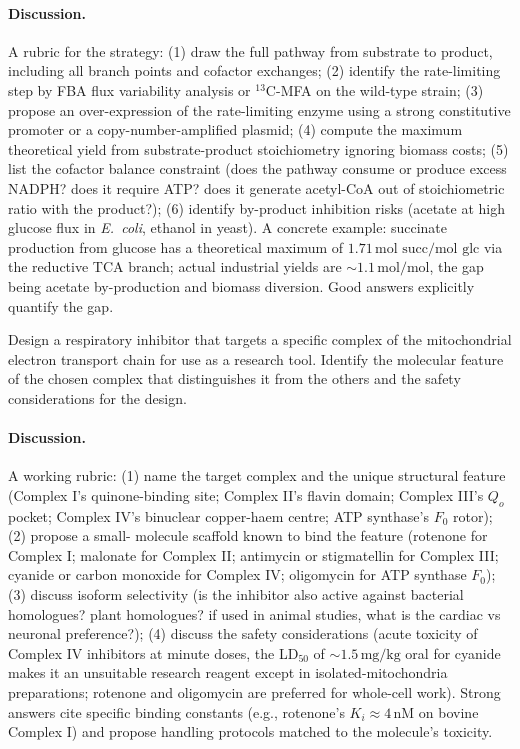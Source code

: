 \paragraph{Discussion.}
A rubric for the strategy: (1) draw the full pathway from substrate
to product, including all branch points and cofactor exchanges; (2)
identify the rate-limiting step by FBA flux variability analysis or
$^{13}$C-MFA on the wild-type strain; (3) propose an over-expression
of the rate-limiting enzyme using a strong constitutive promoter or
a copy-number-amplified plasmid; (4) compute the maximum theoretical
yield from substrate-product stoichiometry ignoring biomass costs;
(5) list the cofactor balance constraint (does the pathway consume
or produce excess NADPH? does it require ATP? does it generate
acetyl-CoA out of stoichiometric ratio with the product?); (6)
identify by-product inhibition risks (acetate at high glucose flux
in \emph{E.~coli}, ethanol in yeast). A concrete example: succinate
production from glucose has a theoretical maximum of $1.71\,\text{mol
succ/mol glc}$ via the reductive TCA branch; actual industrial yields
are $\sim 1.1\,\text{mol/mol}$, the gap being acetate by-production
and biomass diversion. Good answers explicitly quantify the gap.

\begin{exercise}
Design a respiratory inhibitor that targets a specific complex of the
mitochondrial electron transport chain for use as a research tool.
Identify the molecular feature of the chosen complex that distinguishes
it from the others and the safety considerations for the design.
\end{exercise}

\paragraph{Discussion.}
A working rubric: (1) name the target complex and the unique
structural feature (Complex I's quinone-binding site; Complex II's
flavin domain; Complex III's $Q_o$ pocket; Complex IV's binuclear
copper-haem centre; ATP synthase's $F_0$ rotor); (2) propose a small-
molecule scaffold known to bind the feature (rotenone for Complex I;
malonate for Complex II; antimycin or stigmatellin for Complex III;
cyanide or carbon monoxide for Complex IV; oligomycin for ATP
synthase $F_0$); (3) discuss isoform selectivity (is the inhibitor
also active against bacterial homologues? plant homologues? if used
in animal studies, what is the cardiac vs neuronal preference?);
(4) discuss the safety considerations (acute toxicity of Complex IV
inhibitors at minute doses, the LD$_{50}$ of $\sim 1.5\,\text{mg/kg}$
oral for cyanide makes it an unsuitable research reagent except in
isolated-mitochondria preparations; rotenone and oligomycin are
preferred for whole-cell work). Strong answers cite specific binding
constants (e.g., rotenone's $K_i \approx 4\,\text{nM}$ on bovine
Complex I) and propose handling protocols matched to the molecule's
toxicity.

